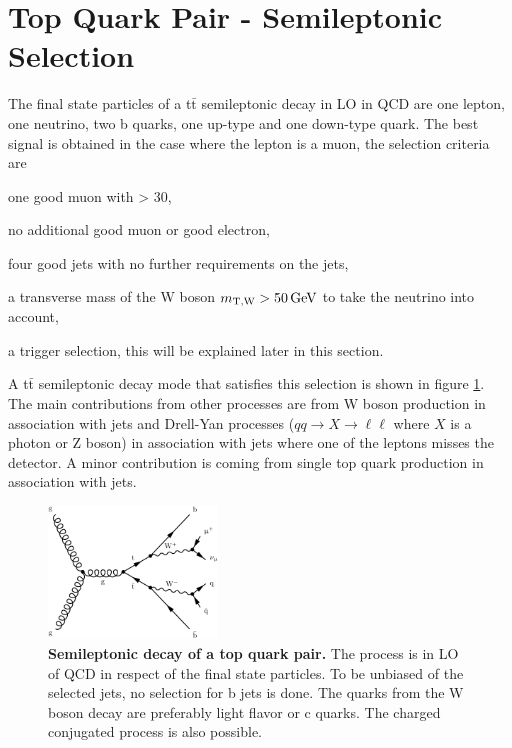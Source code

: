 \section{Top Quark Pair - Semileptonic Selection} \label{sec:ch_6_semilep}
The final state particles of a t$\bar{\textrm{t}}$ semileptonic decay in LO in QCD are one lepton, one neutrino, two b quarks, one up-type and one down-type quark. The best signal is obtained in the case where the lepton is a muon, the selection criteria are
\begin{description}
\setlength{\itemsep}{-20pt}
\item[•] one good muon with \pt > 30,\\
\item[•] no additional good muon or good electron,\\
\item[•] four good jets with no further requirements on the jets,\\
\item[•] a transverse mass of the W boson $m_{\textrm{T,W}} > 50\,\mathrm{GeV}$ to take the neutrino into account,\\
\item[•] a trigger selection, this will be explained later in this section.
\end{description}
A t$\bar{\textrm{t}}$ semileptonic decay mode that satisfies this selection is shown in figure \ref{fig:ch_6_semilep_mu}. The main contributions from other processes are from W boson production in association with jets and Drell-Yan processes ($qq \rightarrow X \rightarrow \ell\ell$ where $X$ is a photon or Z boson) in association with jets where one of the leptons misses the detector. A minor contribution is coming from single top quark production in association with jets. 

\begin{figure}
\centering
\includegraphics[width=0.4\textwidth]{chapter_6_selection/Feynman/semilep_mu_tt.pdf}
\caption[Semileptonic Decay of a Top Quark Pair]{\textbf{Semileptonic decay of a top quark pair.} The process is in LO of QCD in respect of the final state particles. To be unbiased of the selected jets, no selection for b jets is done. The quarks from the W boson decay are preferably light flavor or c quarks. The charged conjugated process is also possible.}
\label{fig:ch_6_semilep_mu}
\end{figure}

